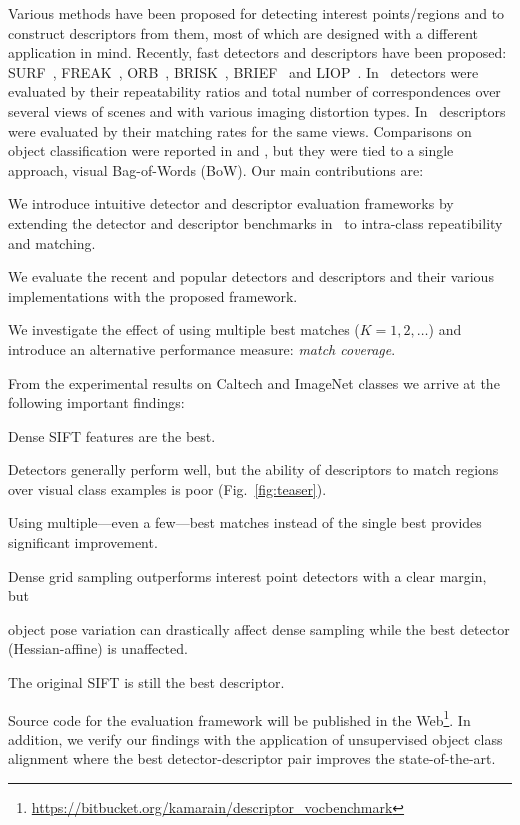 \documentclass[review]{elsarticle}
\begin{document}
Various methods have been proposed for detecting interest
points/regions and to construct descriptors from them,
most of which are designed with a different application in mind.
Recently, fast detectors and descriptors have been
proposed: SURF~\cite{BayEssTuy:2008},
FREAK~\cite{freak}, ORB~\cite{orb}, BRISK~\cite{brisk},
BRIEF~\cite{brief} and LIOP~\cite{Wang:2011}. In~\cite{MikTuySch:2005} detectors
were evaluated by their repeatability ratios and total number of 
correspondences over several views of scenes and with various
imaging distortion types.
In~\cite{MikSch:2005}
descriptors were evaluated by their matching
rates for the same views. Comparisons on object classification
were
reported in \cite{ZhaMarLaz:2006} and
\cite{MikLeiSch:2005}, but they were tied to a single approach,
visual Bag-of-Words (BoW).
Our main contributions are:
\begin{compactitem}
\item We introduce intuitive detector and descriptor evaluation frameworks
by extending the detector and descriptor benchmarks
in~\cite{MikTuySch:2005,MikSch:2005} to intra-class
repeatibility and matching.
\item We evaluate the recent and popular detectors and descriptors and their various 
  implementations with the proposed framework.
\item We investigate the effect of using multiple best matches ($K=1,2,\ldots$) and
  introduce an alternative performance measure: {\em match coverage}.
\end{compactitem}
From the experimental results on Caltech and ImageNet classes we
arrive at the following important findings:
\begin{compactitem}
\item Dense SIFT features are the best.
\item Detectors generally perform well, but the ability of descriptors to match
  regions over visual class examples is poor (Fig.~\ref{fig:teaser}).
\item Using multiple---even a few---best matches instead of the single best
  provides significant improvement.
\item Dense grid sampling outperforms interest point detectors with a clear margin, but
\item object pose variation can drastically affect dense sampling
  while the best detector (Hessian-affine) is unaffected.
\item The original SIFT is still the best descriptor. %
\end{compactitem}
Source code for the evaluation framework will be published in the
Web\footnote{\url{https://bitbucket.org/kamarain/descriptor_vocbenchmark}}. In addition, we verify our findings with the application of unsupervised
object class alignment where the best detector-descriptor pair
improves the state-of-the-art.
\end{document}
